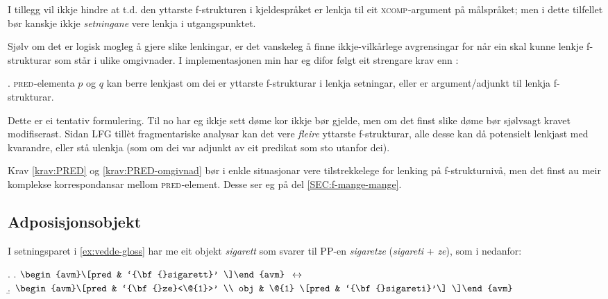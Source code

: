\documentclass[12pt,a4paper,oneside,draft]{report}
\newcommand{\F}[2]{\textsc{#1}\ensuremath{_{#2}}}
\newcommand{\XCOMP}{\F{xcomp}{}}
\newcommand{\PRED}{\F{pred}{}}
\begin{document}
I tillegg vil ikkje \Last hindre at t.d. den yttarste f\hyp{}strukturen i
kjeldespråket er lenkja til eit \XCOMP{}-argument på målspråket; men i
dette tilfellet bør kanskje ikkje \emph{setningane} vere lenkja i
utgangspunktet.

Sjølv om det er logisk mogleg å gjere slike lenkingar, er det
vanskeleg å finne ikkje-vilkårlege avgrensingar for når ein skal kunne
lenkje f\hyp{}strukturar som står i ulike omgivnader. I implementasjonen
min har eg difor følgt eit strengare krav enn \Last[e]:

\ex. \label{krav:PRED-omgivnad} \PRED{}-elementa $p$ og $q$ kan berre
     lenkjast om dei er yttarste f\hyp{}strukturar i lenkja setningar, eller
     er argument/adjunkt til lenkja f\hyp{}strukturar.

Dette er ei tentativ formulering. Til no har eg ikkje sett døme kor
\Last ikkje bør gjelde, men om det finst slike døme bør sjølvsagt
kravet modifiserast. Sidan LFG tillèt fragmentariske analysar kan det
vere \emph{fleire} yttarste f\hyp{}strukturar, alle desse kan då potensielt
lenkjast med kvarandre, eller stå ulenkja (som om dei var adjunkt av
eit predikat som sto utanfor dei).

Krav \ref{krav:PRED} og \ref{krav:PRED-omgivnad} bør i enkle
situasjonar vere tilstrekkelege for lenking på f\hyp{}strukturnivå, men
det finst au meir komplekse korrespondansar mellom \PRED{}-element. Desse
ser eg på del \ref{SEC:f-mange-mange}.


\subsection{Adposisjonsobjekt}
\label{sec-3.6.4}

\label{SEC:adposisjonsobjekt}

 I setningsparet i \ref{ex:vedde-gloss} har me eit objekt \emph{sigarett}
 som svarer til PP-en \emph{sigaretze} (\emph{sigareti} + \emph{ze}), som i \Next
 nedanfor:

{\avmoptions{}
\ex. \a. $\begin{avm}\[pred & `{\bf{}sigarett}' \]\end{avm}\\$
     $\\\leftrightarrow$\\
     \b.     $\begin{avm}\[pred & `{\bf{}ze}<\@{1}>' \\
                 obj & \@{1} \[pred & `{\bf{}sigareti}'\] \]\end{avm}$

}
\end{document}
